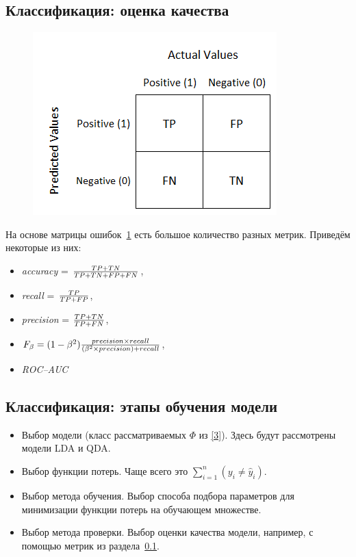 \documentclass[11pt, oneside]{article}   	%
\begin{document}
		\subsection{Классификация: оценка качества}
		\label{metrics}
		\begin{figure}
			\includegraphics[width=0.3\linewidth]{imgs/conf_matrix}
			\label{conf_matrix}
			
		\end{figure}
	    На основе матрицы ошибок~\ref{conf_matrix} есть большое количество разных метрик. Приведём некоторые из них: 
	    \begin{itemize}
	    	\item\textit{accuracy} = ${TP + TN}\over{TP+TN+FP+FN}$, 
	    	\item\textit{recall} = ${TP}\over{TP+FP}$, 
	    	\item\textit{precision} = ${TP + TN}\over{TP+FN}$, 
	    	\item $F_\beta = (1-\beta^2) {{precision \times recall}\over{(\beta^2 \times precision) + recall}}$, 
	    	\item\textit{ROC--AUC}
	    \end{itemize}


		\subsection{Классификация: этапы обучения модели}
		\begin{itemize}
			\item Выбор модели (класс рассматриваемых $\Phi$ из \ref{3}).
					 Здесь будут рассмотрены модели LDA и QDA. 
			\item Выбор функции потерь.
					 Чаще всего это $\sum_{i=1}^{n}(y_i \neq \widehat{y}_i)$.
			\item Выбор метода обучения.
			 		Выбор способа подбора параметров для минимизации функции потерь на обучающем множестве.
			\item Выбор метода проверки.
			 		Выбор оценки качества модели, например, с помощью метрик из раздела~\ref{metrics}.
		\end{itemize}
\end{document}
